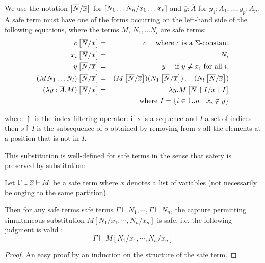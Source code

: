 \begin{dfn}
\label{dnf:safe_simsubst}
 We use the notation $\left[ \overline{N}/\overline{x} \right]$ for $\left[ N_1 \ldots N_n/x_1 \ldots x_n \right]$ and
$\overline{y}:\overline{A}$ for $y_1:A_1, \ldots, y_p:A_p$.
A safe term must have one of the forms occurring on the left-hand side of the following equations, where
the terms $M$, $N_1, \ldots N_l$ are safe terms:
\begin{eqnarray*}
c \left[ \overline{N}/\overline{x} \right] &=& c \quad \mbox{ where $c$ is a $\Sigma$-constant}\\
x_i \left[ \overline{N}/\overline{x} \right] &=& N_i\\
 y \left[ \overline{N}/\overline{x} \right] &=& y \quad \mbox{ if } y \not \neq x_i \mbox{ for all } i,\\
(M N_1 \ldots N_l) \left[ \overline{N}/\overline{x} \right] &=& (M \left[ \overline{N}/\overline{x} \right]) (N_1 \left[ \overline{N}/\overline{x} \right]) \ldots  (N_l \left[ \overline{N}/\overline{x} \right])\\
(\lambda \overline{y} : \overline{A}. M)
\left[ \overline{N}/\overline{x} \right] &=& \lambda \overline{y} . M
\left[ \overline{N} \upharpoonright I/\overline{x} \upharpoonright I \right] \\
&& \mbox{where } I  = \{ i \in 1..n \ | \ x_i \not \in \overline{y} \}
\end{eqnarray*}

where $ \upharpoonright$ is the index filtering operator: if $s$ is a sequence and $I$ a set of indices then
$s \upharpoonright I$ is the subsequence of $s$ obtained by removing from $s$ all the elements
at a position that is not in $I$.
\end{dfn}

This substitution is well-defined for safe terms in the sense that safety is preserved by substitution:

\begin{lem}
\label{lem:subst_preserve_safety}
Let $\Gamma \cup \overline{x} \vdash M$ be a safe term where $\overline{x}$ denotes a list of variables
(not necessarily belonging to the same partition).

Then for any safe terms safe terms $\Gamma \vdash N_1, \cdots, \Gamma \vdash N_n$,
the capture permitting simultaneous substitution $M[N_1 / x_1 , \cdots, N_n / x_n]$ is safe. i.e. the following judgment is valid :
$$ \Gamma \vdash M[N_1 / x_1 , \cdots, N_n / x_n] $$
\end{lem}
\begin{proof}
An easy proof by an induction on the structure of the safe term.
\end{proof}



